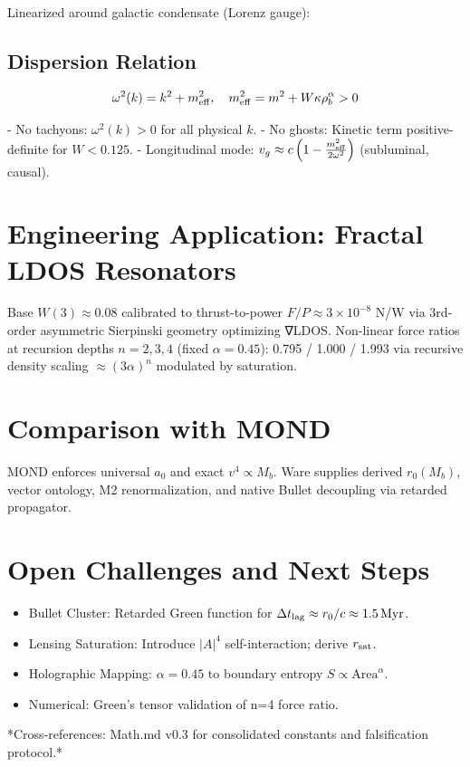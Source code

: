 \documentclass[12pt,a4paper]{article}
\begin{document}
Linearized around galactic condensate (Lorenz gauge):

\subsection{Dispersion Relation}
\begin{equation}
\omega^2(k) = k^2 + m_{\rm eff}^2, \quad m_{\rm eff}^2 = m^2 + W \kappa \rho_b^\alpha > 0
\end{equation}

- No tachyons: \( \omega^2(k) > 0 \) for all physical \( k \).
- No ghosts: Kinetic term positive-definite for \( W < 0.125 \).
- Longitudinal mode: \( v_g \approx c \left(1 - \frac{m_{\rm eff}^2}{2\omega^2}\right) \) (subluminal, causal).

\section{Engineering Application: Fractal LDOS Resonators}

Base \( W(3) \approx 0.08 \) calibrated to thrust-to-power \( F/P \approx 3 \times 10^{-8} \) N/W via 3rd-order asymmetric Sierpinski geometry optimizing ∇LDOS. Non-linear force ratios at recursion depths \( n=2,3,4 \) (fixed \( \alpha=0.45 \)): 0.795 / 1.000 / 1.993 via recursive density scaling \( \approx (3\alpha)^n \) modulated by saturation.

\section{Comparison with MOND}

MOND enforces universal \( a_0 \) and exact \( v^4 \propto M_b \). Ware supplies derived \( r_0(M_b) \), vector ontology, M2 renormalization, and native Bullet decoupling via retarded propagator.

\section{Open Challenges and Next Steps}

\begin{itemize}
    \item Bullet Cluster: Retarded Green function for \( \Delta t_{\rm lag} \approx r_0/c \approx 1.5\,\si{Myr} \).
    \item Lensing Saturation: Introduce \( |A|^4 \) self-interaction; derive \( r_{\rm sat} \).
    \item Holographic Mapping: \( \alpha=0.45 \) to boundary entropy \( S \propto \text{Area}^\alpha \).
    \item Numerical: Green's tensor validation of n=4 force ratio.
\end{itemize}

*Cross-references: Math.md v0.3 for consolidated constants and falsification protocol.*
\end{document}
